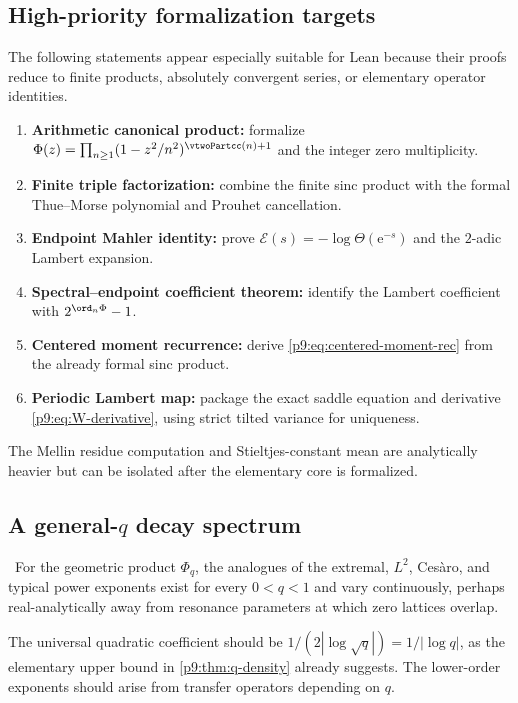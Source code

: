 \documentclass[11pt]{article}
\numberwithin{equation}{section}
\theoremstyle{definition}
\theoremstyle{remark}
\newcommand{\e}{\mathrm e}
\begin{document}
\subsection{High-priority formalization targets}
The following statements appear especially suitable for Lean because their proofs reduce to
finite products, absolutely convergent series, or elementary operator identities.
\begin{enumerate}
\item \textbf{Arithmetic canonical product:} formalize
$\Phi(z)=\prod_{n\ge1}(1-z^2/n^2)^{\vtwoPartcc(n)+1}$ and the integer zero multiplicity.
\item \textbf{Finite triple factorization:} combine the finite sinc product with the
formal Thue--Morse polynomial and Prouhet cancellation.
\item \textbf{Endpoint Mahler identity:} prove
$\mathcal E(s)=-\log\Theta(\e^{-s})$ and the $2$-adic Lambert expansion.
\item \textbf{Spectral--endpoint coefficient theorem:} identify the Lambert coefficient
with $2^{\ord_n\Phi}-1$.
\item \textbf{Centered moment recurrence:} derive
\eqref{p9:eq:centered-moment-rec} from the already formal sinc product.
\item \textbf{Periodic Lambert map:} package the exact saddle equation and derivative
\eqref{p9:eq:W-derivative}, using strict tilted variance for uniqueness.
\end{enumerate}
The Mellin residue computation and Stieltjes-constant mean are analytically heavier but can
be isolated after the elementary core is formalized.

\subsection{A general-$q$ decay spectrum}
\begin{conjecture}\label{p9:conj:q-spectrum}
\statusC\ For the geometric product $\Phi_q$, the analogues of the extremal, $L^2$,
Ces\`aro, and typical power exponents exist for every $0<q<1$ and vary continuously, perhaps
real-analytically away from resonance parameters at which zero lattices overlap.
\end{conjecture}
The universal quadratic coefficient should be
$1/(2|\log\sqrt q|)=1/|\log q|$, as the elementary upper bound in
\cref{p9:thm:q-density} already suggests.  The lower-order exponents should arise from transfer
operators depending on $q$.
\end{document}
